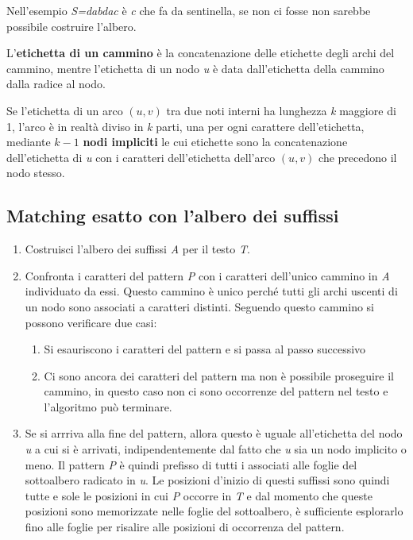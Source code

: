 Nell'esempio \emph{S=dabdac} è \emph{c} che fa da sentinella, se non ci fosse non sarebbe possibile costruire l'albero.

L'\textbf{etichetta di un cammino} è la concatenazione delle etichette degli archi del cammino, mentre l'etichetta di un nodo \emph{u} è data dall'etichetta della cammino dalla radice al nodo.

Se l'etichetta di un arco $ (u,v) $ tra due noti interni ha lunghezza \textit{k} maggiore di 1, l'arco è in realtà diviso in \textit{k} parti, una per ogni carattere dell'etichetta, mediante $ k-1 $ \textbf{nodi impliciti} le cui etichette sono la concatenazione dell'etichetta di \textit{u} con i caratteri dell'etichetta dell'arco $ (u,v) $ che precedono il nodo stesso.

\subsection{Matching esatto con l'albero dei suffissi}\label{matching-esatto-con-lalbero-dei-suffissi}

\begin{enumerate}
	\item Costruisci l'albero dei suffissi \textit{A} per il testo \textit{T}.
	\item Confronta i caratteri del pattern \textit{P} con i caratteri dell'unico cammino in \textit{A} individuato da essi. Questo cammino è unico perché tutti gli archi uscenti di un nodo sono associati a caratteri distinti. Seguendo questo cammino si possono verificare due casi:
	\begin{enumerate}
		\item Si esauriscono i caratteri del pattern e si passa al passo successivo
		\item Ci sono ancora dei caratteri del pattern ma non è possibile proseguire il cammino, in questo caso non ci sono occorrenze del pattern nel testo e l'algoritmo può terminare.
	\end{enumerate}
	\item Se si arrriva alla fine del pattern, allora questo è uguale all'etichetta del nodo \textit{u} a cui si è arrivati, indipendentemente dal fatto che \textit{u} sia un nodo implicito o meno. Il pattern \textit{P} è quindi prefisso di tutti i associati alle foglie del sottoalbero radicato in \textit{u}. Le posizioni d'inizio di questi suffissi sono quindi tutte e sole le posizioni in cui \textit{P} occorre in \textit{T} e dal momento che queste posizioni sono memorizzate nelle foglie del sottoalbero, è sufficiente esplorarlo fino alle foglie per risalire alle posizioni di occorrenza del pattern.
\end{enumerate}


